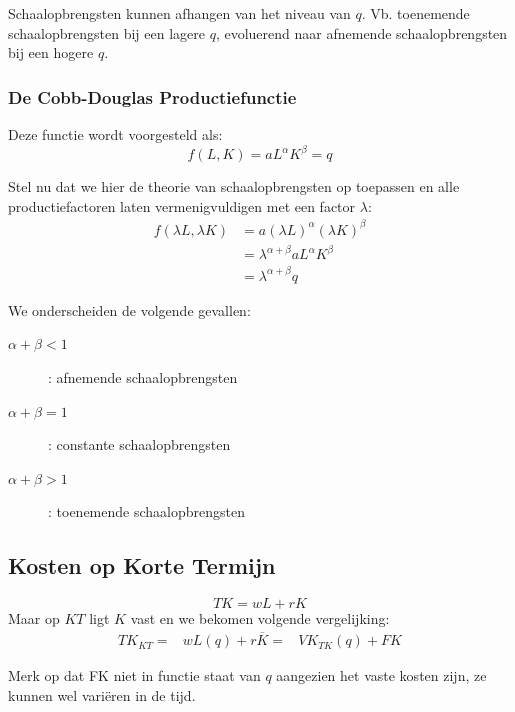 Schaalopbrengsten kunnen afhangen van het niveau van $q$. Vb. toenemende schaalopbrengsten bij een lagere $q$, evoluerend naar afnemende schaalopbrengsten bij een hogere $q$.

\subsubsection{De Cobb-Douglas Productiefunctie}
Deze functie wordt voorgesteld als:
\begin{equation}
	f(L,K) = a L^\alpha K^\beta = q
\end{equation}

Stel nu dat we hier de theorie van schaalopbrengsten op toepassen en alle productiefactoren laten vermenigvuldigen met een factor $\lambda$:
\begin{align}
	f(\lambda L, \lambda K) &= a (\lambda L)^\alpha (\lambda K)^\beta	\\
	&= \lambda^{\alpha + \beta} a L^\alpha K^\beta	\\
	&= \lambda^{\alpha + \beta} q
\end{align}

We onderscheiden de volgende gevallen:
\begin{description}
	\item[$\alpha + \beta < 1$]: afnemende schaalopbrengsten
	\item[$\alpha + \beta = 1$]: constante schaalopbrengsten
	\item[$\alpha + \beta > 1$]: toenemende schaalopbrengsten
\end{description}



\subsection{Kosten op Korte Termijn}
\begin{equation}
	TK = wL + rK
\end{equation}
Maar op $KT$ ligt $K$ vast en we bekomen volgende vergelijking:
\begin{align}
	TK_{KT} =& w L(q) + r\overline{K}
		=& VK_{TK}(q) + FK
\end{align}

Merk op dat FK niet in functie staat van $q$ aangezien het vaste kosten zijn, ze kunnen wel vari\"eren in de tijd.


